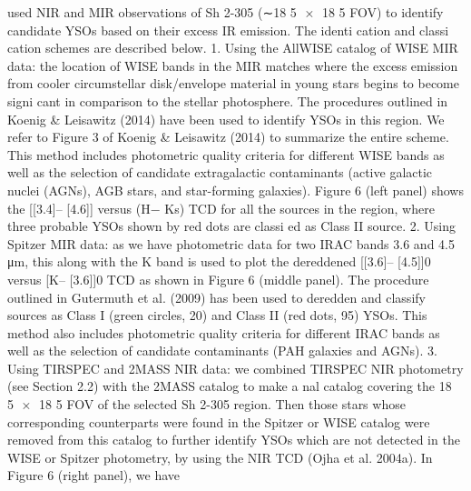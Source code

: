 \documentclass[../main.tex]{subfiles}
\begin{document}
{used NIR and MIR observations of Sh 2-305 (∼18 5
×
18 5
FOV) to identify candidate YSOs based on their excess IR
emission. The identi cation and classi cation schemes are
described below.
1. Using the AllWISE catalog of WISE MIR data: the location
of WISE bands in the MIR matches where the excess
emission from cooler circumstellar disk/envelope material
in young stars begins to become signi cant in comparison
to the stellar photosphere. The procedures outlined in
Koenig & Leisawitz (2014) have been used to identify
YSOs in this region. We refer to Figure 3 of Koenig &
Leisawitz (2014) to summarize the entire scheme. This
method includes photometric quality criteria for different
WISE bands as well as the selection of candidate
extragalactic contaminants (active galactic nuclei (AGNs),
AGB stars, and star-forming galaxies). Figure 6 (left panel)
shows the [[3.4]– [4.6]] versus (H− Ks) TCD for all the
sources in the region, where three probable YSOs shown by
red dots are classi ed as Class II source.
2. Using Spitzer MIR data: as we have photometric data for
two IRAC bands 3.6 and 4.5 μm, this along with the K
band is used to plot the dereddened [[3.6]– [4.5]]0 versus
[K– [3.6]]0 TCD as shown in Figure 6 (middle panel).
The procedure outlined in Gutermuth et al. (2009) has
been used to deredden and classify sources as Class I
(green circles, 20) and Class II (red dots, 95) YSOs. This
method also includes photometric quality criteria for
different IRAC bands as well as the selection of candidate
contaminants (PAH galaxies and AGNs).
3. Using TIRSPEC and 2MASS NIR data: we combined
TIRSPEC NIR photometry (see Section 2.2) with the
2MASS catalog to make a nal catalog covering the
18 5
×
18 5 FOV of the selected Sh 2-305 region. Then
those stars whose corresponding counterparts were found
in the Spitzer or WISE catalog were removed from this
catalog to further identify YSOs which are not detected in
the WISE or Spitzer photometry, by using the NIR TCD
(Ojha et al. 2004a). In Figure 6 (right panel), we have

}
\end{document}
